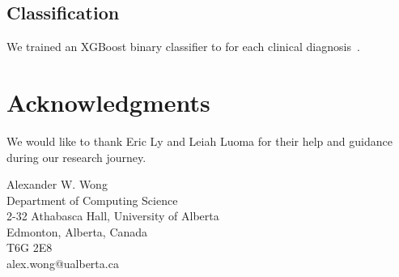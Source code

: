 \documentclass[twocolumn]{cinc}
\begin{document}
\subsection{Classification}

We trained an XGBoost binary classifier to for each clinical diagnosis~\cite{chen_xgboost_2016}.


\section*{Acknowledgments}
We would like to thank Eric Ly and Leiah Luoma for their help and guidance during our research journey.



\begin{correspondence}
Alexander W. Wong\\
Department of Computing Science\\
2-32 Athabasca Hall, University of Alberta\\
Edmonton, Alberta, Canada\\
T6G 2E8\\
alex.wong@ualberta.ca
\end{correspondence}
\end{document}
